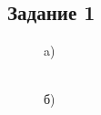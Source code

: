 \documentclass[
11pt,
master, %
subf, %
href, %
colorlinks=true, %
times, %
]{disser}
\begin{document}
\subsection*{Задание 1}
\begin{figure}[h]
\begin{minipage}[h]{0.47\linewidth}
 a) \\
\end{minipage}
\hfill
\begin{minipage}[h]{0.47\linewidth}
 \\б)

\end{minipage}
\end{figure}
\end{document}
